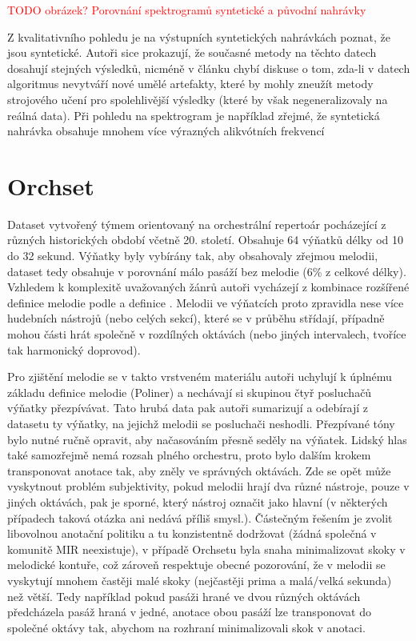 \textcolor{red}{TODO obrázek? Porovnání spektrogramů syntetické a původní nahrávky}

Z kvalitativního pohledu je na výstupních syntetických nahrávkách poznat, že jsou syntetické. Autoři sice prokazují, že současné metody na těchto datech dosahují stejných výsledků, nicméně v článku chybí diskuse o tom, zda-li v datech algoritmus nevytváří nové umělé artefakty, které by mohly zneužít metody strojového učení pro spolehlivější výsledky (které by však negeneralizovaly na reálná data). Při pohledu na spektrogram je například zřejmé, že syntetická nahrávka obsahuje mnohem více výrazných alikvótních frekvencí

\section{Orchset}

Dataset vytvořený týmem \cite{Bosch2016} orientovaný na orchestrální repertoár pocházející z různých historických období včetně 20. století. Obsahuje 64 výňatků délky od 10 do 32 sekund. Výňatky byly vybírány tak, aby obsahovaly zřejmou melodii, dataset tedy obsahuje v porovnání málo pasáží bez melodie (6\% z celkové délky). Vzhledem k komplexitě uvažovaných žánrů autoři vycházejí z kombinace rozšířené definice melodie podle \cite{Bittner2014} a definice \cite{Poliner2007}. Melodii ve výňatcích proto zpravidla nese více hudebních nástrojů (nebo celých sekcí), které se v průběhu střídají, případně mohou části hrát společně v rozdílných oktávách (nebo jiných intervalech, tvoříce tak harmonický doprovod). 

Pro zjištění melodie se v takto vrstveném materiálu autoři uchylují k úplnému základu definice melodie (Poliner) a nechávají si skupinou čtyř posluchačů výňatky přezpívávat. Tato hrubá data pak autoři sumarizují a odebírají z datasetu ty výňatky, na jejichž melodii se posluchači neshodli. Přezpívané tóny bylo nutné ručně opravit, aby načasováním přesně seděly na výňatek. Lidský hlas také samozřejmě nemá rozsah plného orchestru, proto bylo dalším krokem transponovat anotace tak, aby zněly ve správných oktávách. Zde se opět může vyskytnout problém subjektivity, pokud melodii hrají dva různé nástroje, pouze v jiných oktávách, pak je sporné, který nástroj označit jako hlavní (v některých případech taková otázka ani nedává příliš smysl.). Částečným řešením je zvolit libovolnou anotační politiku a tu konzistentně dodržovat (žádná společná v komunitě MIR neexistuje), v případě Orchsetu byla snaha minimalizovat skoky v melodické kontuře, což zároveň respektuje obecné pozorování, že v melodii se vyskytují mnohem častěji malé skoky (nejčastěji prima a malá/velká sekunda) než větší. Tedy například pokud pasáži hrané ve dvou různých oktávách předcházela pasáž hraná v jedné, anotace obou pasáží lze transponovat do společné oktávy tak, abychom na rozhraní minimalizovali skok v anotaci.

